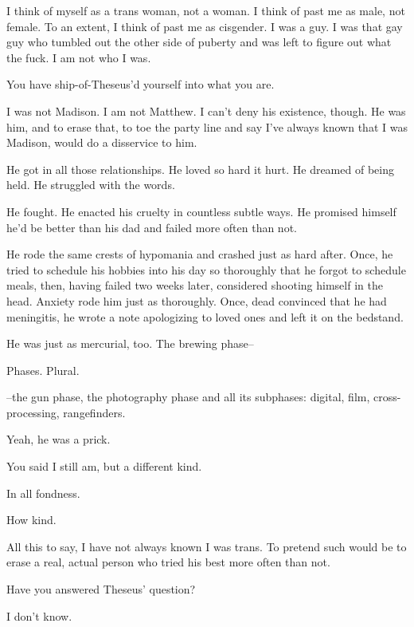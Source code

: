 \noindent I think of myself as a trans woman, not a woman. I think of past me as male, not female. To an extent, I think of past me as cisgender. I was a guy. I was that gay guy who tumbled out the other side of puberty and was left to figure out what the fuck. I am not who I was.

\begin{ally}
You have ship-of-Theseus'd yourself into what you are.
\end{ally}
I was not Madison. I am not Matthew. I can't deny his existence, though. He was him, and to erase that, to toe the party line and say I've always known that I was Madison, would do a disservice to him.

He got in all those relationships. He loved so hard it hurt. He dreamed of being held. He struggled with the words.

He fought. He enacted his cruelty in countless subtle ways. He promised himself he'd be better than his dad and failed more often than not.

He rode the same crests of hypomania and crashed just as hard after. Once, he tried to schedule his hobbies into his day so thoroughly that he forgot to schedule meals, then, having failed two weeks later, considered shooting himself in the head. Anxiety rode him just as thoroughly. Once, dead convinced that he had meningitis, he wrote a note apologizing to loved ones and left it on the bedstand.

He was just as mercurial, too. The brewing phase--

\begin{ally}
Phases. Plural.
\end{ally}
--the gun phase, the photography phase and all its subphases: digital, film, cross-processing, rangefinders.

\begin{ally}
Yeah, he was a prick.
\end{ally}
You said I still am, but a different kind.

\begin{ally}
In all fondness.
\end{ally}
How kind.

All this to say, I have not always known I was trans. To pretend such would be to erase a real, actual person who tried his best more often than not.

\begin{ally}
Have you answered Theseus' question?
\end{ally}
I don't know.

\newpage
